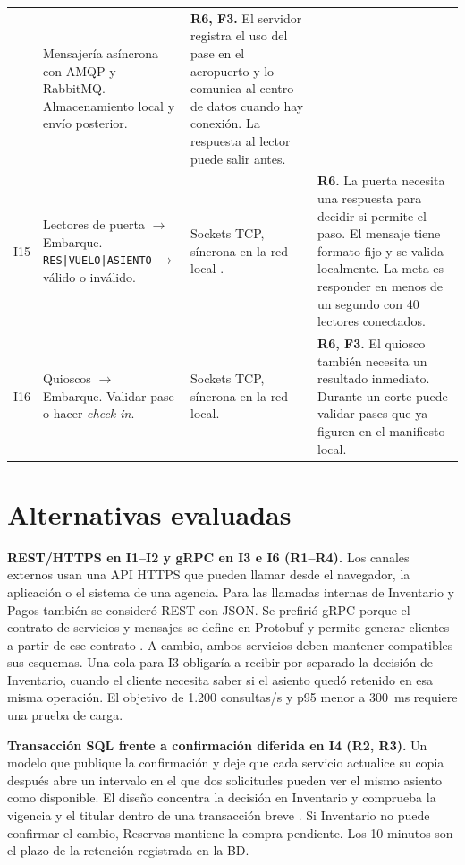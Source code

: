 \documentclass[11pt,a4paper]{article}
\newcommand{\flecha}{\(\to\)}
\begin{document}
{\begin{longtable}{@{}P{0.75cm}P{4.25cm}P{4.1cm}P{7.2cm}@{}}
& Mensajería asíncrona con AMQP y RabbitMQ. Almacenamiento local y envío posterior.
& \textbf{R6, F3.} El servidor registra el uso del pase en el aeropuerto y lo comunica al centro de datos cuando hay conexión. La respuesta al lector puede salir antes. \\
\addlinespace
I15 & Lectores de puerta \flecha{} Embarque. \texttt{RES|VUELO|ASIENTO} \flecha{} válido o inválido.
& Sockets TCP, síncrona en la red local \cite[sec. 2.2]{tcp}.
& \textbf{R6.} La puerta necesita una respuesta para decidir si permite el paso. El mensaje tiene formato fijo y se valida localmente. La meta es responder en menos de un segundo con 40 lectores conectados. \\
\addlinespace
I16 & Quioscos \flecha{} Embarque. Validar pase o hacer \textit{check-in}.
& Sockets TCP, síncrona en la red local.
& \textbf{R6, F3.} El quiosco también necesita un resultado inmediato. Durante un corte puede validar pases que ya figuren en el manifiesto local. \\
\end{longtable}
}

\section*{Alternativas evaluadas}

\textbf{REST/HTTPS en I1--I2 y gRPC en I3 e I6 (R1--R4).}
Los canales externos usan una API HTTPS que pueden llamar desde el navegador, la aplicación o el sistema de una agencia. Para las llamadas internas de Inventario y Pagos también se consideró REST con JSON. Se prefirió gRPC porque el contrato de servicios y mensajes se define en Protobuf y permite generar clientes a partir de ese contrato \cite{grpc-core}. A cambio, ambos servicios deben mantener compatibles sus esquemas. Una cola para I3 obligaría a recibir por separado la decisión de Inventario, cuando el cliente necesita saber si el asiento quedó retenido en esa misma operación. El objetivo de 1.200 consultas/s y p95 menor a 300~ms requiere una prueba de carga.

\textbf{Transacción SQL frente a confirmación diferida en I4 (R2, R3).}
Un modelo que publique la confirmación y deje que cada servicio actualice su copia después abre un intervalo en el que dos solicitudes pueden ver el mismo asiento como disponible. El diseño concentra la decisión en Inventario y comprueba la vigencia y el titular dentro de una transacción breve \cite[sec. 13.3.2]{postgres}. Si Inventario no puede confirmar el cambio, Reservas mantiene la compra pendiente. Los 10 minutos son el plazo de la retención registrada en la BD.
\end{document}
